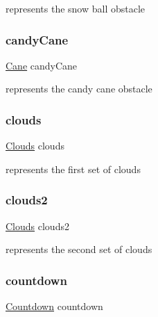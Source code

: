 represents the snow ball obstacle 

\mbox{\label{group___graphics_gaba4d7c50cbd75917285fd6c4ec1c1c10}} 
\subsubsection{\texorpdfstring{candy\+Cane}{candyCane}}
{\footnotesize\ttfamily \hyperlink{struct_cane}{Cane} candy\+Cane\hspace{0.3cm}{\ttfamily [static]}}



represents the candy cane obstacle 

\mbox{\label{group___graphics_ga6e84b95e51e590713cb4891fbe59ea3b}} 
\subsubsection{\texorpdfstring{clouds}{clouds}}
{\footnotesize\ttfamily \hyperlink{struct_clouds}{Clouds} clouds\hspace{0.3cm}{\ttfamily [static]}}



represents the first set of clouds 

\mbox{\label{group___graphics_gad6ab919c4fef2f8337350a9ce79299a9}} 
\subsubsection{\texorpdfstring{clouds2}{clouds2}}
{\footnotesize\ttfamily \hyperlink{struct_clouds}{Clouds} clouds2\hspace{0.3cm}{\ttfamily [static]}}



represents the second set of clouds 

\mbox{\label{group___graphics_ga94449fd3ac7dc9c0f223ad7cab4d7287}} 
\subsubsection{\texorpdfstring{countdown}{countdown}}
{\footnotesize\ttfamily \hyperlink{struct_countdown}{Countdown} countdown\hspace{0.3cm}{\ttfamily [static]}}



